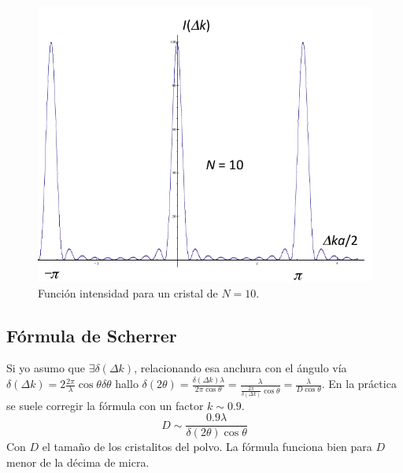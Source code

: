\begin{figure}
  \centering
  \includegraphics[width=\textwidth]{figures/comb_finite.png}
  \caption{Función intensidad para un cristal de $N=10$.}
  \label{fig:comb_finite}
\end{figure}
\subsection{Fórmula de Scherrer} Si yo asumo que
$\exists \delta(\Delta k)$, relacionando esa anchura con el ángulo vía
$\delta(\Delta k) = 2 \frac{2\pi}{\lambda}\cos \theta \delta \theta$
hallo
$\delta(2\theta) = \frac{\delta(\Delta k)\lambda}{2\pi\cos\theta} =
\frac{\lambda}{\frac{2\pi}{\delta(\Delta k)}\cos \theta} =
\frac{\lambda}{D \cos \theta}$.
En la práctica se suele corregir la fórmula con un factor $k\sim 0.9$.
\begin{equation}
  D \sim \frac{0.9 \lambda}{\delta(2\theta) \cos \theta} \tag{Scherrer's eq.}
\end{equation}
Con $D$ el tamaño de los cristalitos del polvo. La fórmula funciona bien
para $D$ menor de la décima de micra.

